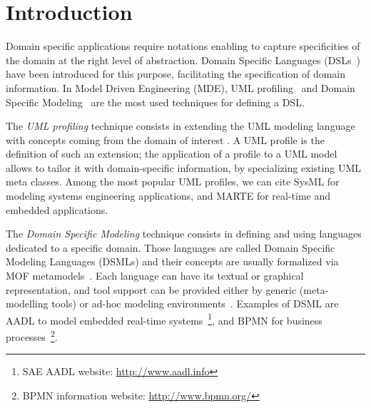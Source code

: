 \section{Introduction}\label{sec:intro}

Domain specific applications require notations enabling to capture specificities of the domain at the right level of abstraction. Domain Specific Languages (DSLs~\cite{FowlerBook}) have been introduced for this purpose, facilitating the specification of domain information. In Model Driven Engineering (MDE), UML profiling~\cite{UML} and Domain Specific Modeling~\cite{DSML} are the most used techniques for defining a DSL.

The \textit{UML profiling} technique consists in extending the UML modeling language with concepts coming from
the domain of interest \cite{UMLprofile}.
A UML profile is the definition of such an extension; the application of a profile to a UML model allows to tailor it with domain-specific information, by specializing existing UML meta classes. Among the most popular UML profiles, we can cite SysML \cite{sysml}
for modeling systems engineering applications, and MARTE \cite{marte} for real-time and embedded applications.

The \textit{Domain Specific Modeling} technique consists in defining and using languages dedicated to a specific domain.
Those languages are called Domain Specific Modeling Languages (DSMLs) and their concepts are usually formalized  via MOF metamodels~\cite{MOF}.
Each language can have its textual or graphical representation, and tool support can be provided either by generic (meta-modelling tools) or
ad-hoc modeling environments~\cite{DSML}.
Examples of DSML are AADL to model embedded real-time systems~\footnote{SAE AADL website: \small{\url{http://www.aadl.info}}}, 
and BPMN for business processes~\footnote{BPMN information website: \small{\url{http://www.bpmn.org/}}}.

